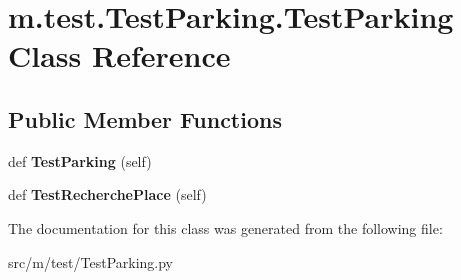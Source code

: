 \hypertarget{classm_1_1test_1_1_test_parking_1_1_test_parking}{}\section{m.\+test.\+Test\+Parking.\+Test\+Parking Class Reference}
\label{classm_1_1test_1_1_test_parking_1_1_test_parking}
\subsection*{Public Member Functions}
\begin{DoxyCompactItemize}
\item 
\hypertarget{classm_1_1test_1_1_test_parking_1_1_test_parking_af8c282bca3237f061f528cb44d83d586}{}def {\bfseries Test\+Parking} (self)\label{classm_1_1test_1_1_test_parking_1_1_test_parking_af8c282bca3237f061f528cb44d83d586}

\item 
\hypertarget{classm_1_1test_1_1_test_parking_1_1_test_parking_a981596102ecd0605577fc0fa95208833}{}def {\bfseries Test\+Recherche\+Place} (self)\label{classm_1_1test_1_1_test_parking_1_1_test_parking_a981596102ecd0605577fc0fa95208833}

\end{DoxyCompactItemize}


The documentation for this class was generated from the following file\+:\begin{DoxyCompactItemize}
\item 
src/m/test/Test\+Parking.\+py\end{DoxyCompactItemize}
